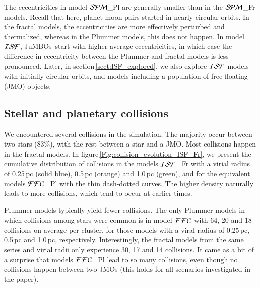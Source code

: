 \documentclass[submission,phys]{lib/SciPost}
\newcommand{\jumbos}{\mbox{JuMBOs}}
\begin{document}
The eccentricities in model ${\cal SPM}$\_Pl are generally smaller
than in the ${\cal SPM}$\_Fr models. Recall that here, planet-moon
pairs started in nearly circular orbits.  In the fractal models, the
eccentricities are more effectively perturbed and thermalized, whereas
in the Plummer models, this does not happen.  In model ${\cal ISF}$,
\jumbos\, start with higher average eccentricities, in which case the
difference in eccentricity between the Plummer and fractal models is
less pronounced. Later, in section\,\ref{sect:ISF_explored}, we also
explore ${\cal ISF}$ models with initially circular orbits, and models
including a population of free-floating (JMO) objects.

\subsection{Stellar and planetary collisions}\label{Sect:collisions}

We encountered several collisions in the simulation. The
majority occur between two stars (83\%), with the rest between a star
and a JMO. Most collisions happen in the fractal models.
In figure\,\ref{Fig:collision_evolution_ISF_Fr}, we present the
cumulative distribution of collisions in the models ${\cal ISF}$\_Fr
with a virial radius of 0.25\,pc (solid blue), 0.5\,pc (orange) and
1.0\,pc (green), and for the equivalent models ${\cal FFC}$\_Pl with the
thin dash-dotted curves.  The higher density naturally leads to more
collisions, which tend to occur at earlier times.  

Plummer models typically yield fewer collisions.  The only Plummer
models in which collisions among stars were common is in model ${\cal
  FFC}$ with 64, 20 and 18 collisions on average per cluster, for
those models with a viral radius of 0.25\,pc, 0.5\,pc and 1.0\,pc,
respectively.  Interestingly, the fractal models from the same
series and virial radii only experience 30, 17 and 14 collisions.  
It came as a bit of a surprise that models ${\cal FFC}$\_Pl
lead to so many collisions, even though no collisions happen between
two JMOs (this holds for all scenarios investigated in the paper).
\end{document}
